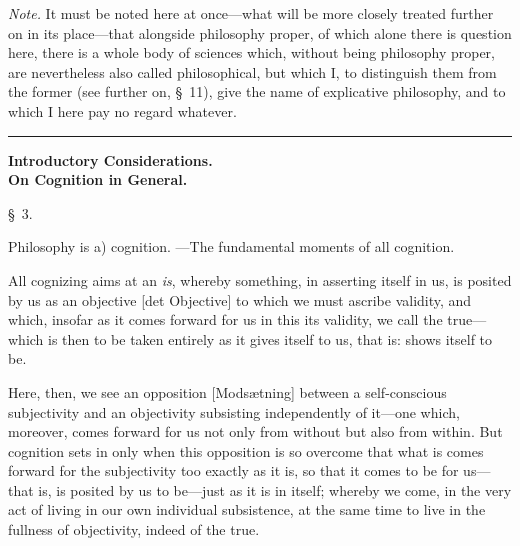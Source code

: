 \documentclass[12pt,a4paper]{book}
\newcommand{\grouphead}[1]{%
  \bigskip\begin{center}\large\textbf{#1}\end{center}\smallskip}
\begin{document}
{\small\emph{Note.} It must be noted here at once---what will be more closely
treated further on in its place---that alongside philosophy proper, of which alone
there is question here, there is a whole body of sciences which, without being
philosophy proper, are nevertheless also called philosophical, but which I, to
distinguish them from the former (see further on, \S~11), give the name of
explicative philosophy, and to which I here pay no regard whatever.\par}

\begin{center}\rule{0.18\linewidth}{0.4pt}\end{center}

\grouphead{Introductory Considerations.\\[2pt]\normalsize On Cognition in General.}

\begin{center}\large\S~3.\end{center}
\begin{center}Philosophy is a) cognition. ---The fundamental moments of all cognition.\end{center}

All cognizing aims at an \emph{is}, whereby something, in asserting itself in us,
is posited by us as an objective [det Objective] to which we must ascribe
validity, and which, insofar as it comes forward for us in this its validity, we
call the true---which is then to be taken entirely as it gives itself to us, that
is: shows itself to be.

Here, then, we see an opposition [Modsætning] between a self-conscious
subjectivity and an objectivity subsisting independently of it---one which,
moreover, comes forward for us not only from without but also from within. But
cognition sets in only when this opposition is so overcome that what is comes
forward for the subjectivity too exactly as it is, so that it comes to be for
us---that is, is posited by us to be---just as it is in itself; whereby we come,
in the very act of living in our own individual subsistence, at the same time to
live in the fullness of objectivity, indeed of the true.
\end{document}
